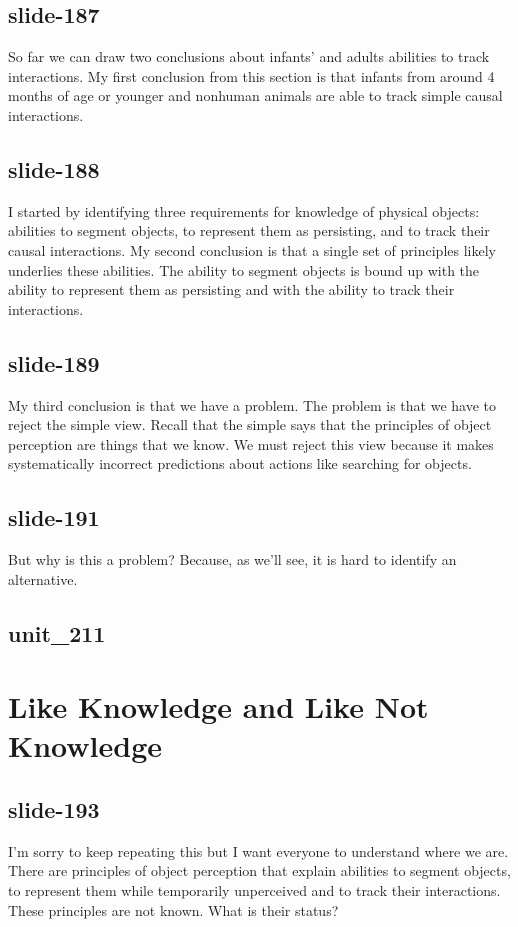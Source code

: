 \documentclass[12pt,\papersize]{extarticle}
\begin{document}
 
\subsection{slide-187}
So far we can draw two conclusions about infants' and adults abilities to track interactions.
My first conclusion from this section is that infants from around 4 months of age or younger and nonhuman animals are able to track simple causal interactions.
 
 
\subsection{slide-188}
I started by identifying three requirements for knowledge of physical objects: abilities to segment objects, to represent them as persisting, and to track their causal interactions.
My second conclusion is that a single set of principles likely underlies these abilities.
The ability to segment objects is bound up with the ability to represent them as persisting and with the ability to track their interactions.
 
 
\subsection{slide-189}
My third conclusion is that we have a problem.
The problem is that we have to reject the simple view.
Recall that the simple says that the principles of object perception are things that we know.
We must reject this view because it makes systematically incorrect predictions about actions like searching for objects.
 
 
\subsection{slide-191}
But why is this a problem?
Because, as we'll see, it is hard to identify an alternative.
 
 
\subsection{unit\_211}
 
\section{Like Knowledge and Like Not Knowledge}
 
 
\subsection{slide-193}
I'm sorry to keep repeating this but I want everyone to understand where we are.
There are principles of object perception that explain abilities to segment objects, to represent them while temporarily unperceived and to track their interactions.
These principles are not known. What is their status?
 
\end{document}
